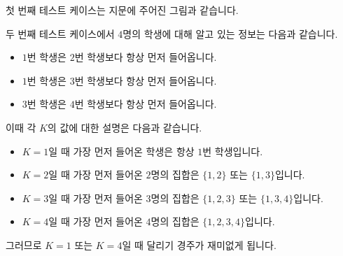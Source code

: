 첫 번째 테스트 케이스는 지문에 주어진 그림과 같습니다.

두 번째 테스트 케이스에서 $4$명의 학생에 대해 알고 있는 정보는 다음과 같습니다.

\begin{itemize}
\item $1$번 학생은 $2$번 학생보다 항상 먼저 들어옵니다.
\item $1$번 학생은 $3$번 학생보다 항상 먼저 들어옵니다.
\item $3$번 학생은 $4$번 학생보다 항상 먼저 들어옵니다. 
\end{itemize}

이때 각 $K$의 값에 대한 설명은 다음과 같습니다.

\begin{itemize}
\item $K=1$일 때 가장 먼저 들어온 학생은 항상 $1$번 학생입니다.
\item $K=2$일 때 가장 먼저 들어온 $2$명의 집합은 $\{1,2\}$ 또는 $\{1,3\}$입니다.
\item $K=3$일 때 가장 먼저 들어온 $3$명의 집합은 $\{1,2,3\}$ 또는 $\{1,3,4\}$입니다.
\item $K=4$일 때 가장 먼저 들어온 $4$명의 집합은 $\{1,2,3,4\}$입니다.
\end{itemize}

그러므로 $K=1$ 또는 $K=4$일 때 달리기 경주가 재미없게 됩니다.